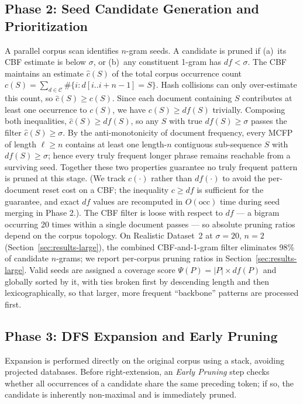\documentclass[runningheads]{llncs}
\begin{document}
    \subsection{Phase 2: Seed Candidate Generation and Prioritization}
    A parallel corpus scan identifies $n$-gram seeds. A candidate is pruned if (a)~its CBF estimate is below $\sigma$, or (b)~any constituent 1-gram has $df < \sigma$. The CBF maintains an estimate $\hat{c}(S)$ of the total corpus occurrence count $c(S) = \sum_{d \in \mathcal{C}} \#\{i : d[i..i+n-1] = S\}$. Hash collisions can only over-estimate this count, so $\hat{c}(S) \geq c(S)$. Since each document containing $S$ contributes at least one occurrence to $c(S)$, we have $c(S) \geq df(S)$ trivially. Composing both inequalities, $\hat{c}(S) \geq df(S)$, so any $S$ with true $df(S) \geq \sigma$ passes the filter $\hat{c}(S) \geq \sigma$. By the anti-monotonicity of document frequency, every MCFP of length $\ell \geq n$ contains at least one length-$n$ contiguous sub-sequence $S$ with $df(S) \geq \sigma$; hence every truly frequent longer phrase remains reachable from a surviving seed. Together these two properties guarantee no truly frequent pattern is pruned at this stage. (We track $c(\cdot)$ rather than $df(\cdot)$ to avoid the per-document reset cost on a CBF; the inequality $c \geq df$ is sufficient for the guarantee, and exact $df$ values are recomputed in $O(\text{occ})$ time during seed merging in Phase 2.). The CBF filter is loose with respect to $df$ — a bigram occurring 20 times within a single document passes — so absolute pruning ratios depend on the corpus topology. On Realistic Dataset~2 at $\sigma = 20$, $n = 2$ (Section~\ref{sec:results-large}), the combined CBF-and-1-gram filter eliminates 98\% of candidate $n$-grams; we report per-corpus pruning ratios in Section~\ref{sec:results-large}. Valid seeds are assigned a coverage score $\Psi(P) = |P| \times df(P)$ and globally sorted by it, with ties broken first by descending length and then lexicographically, so that larger, more frequent ``backbone'' patterns are processed first.

    \subsection{Phase 3: DFS Expansion and Early Pruning}
    Expansion is performed directly on the original corpus using a stack, avoiding projected databases. Before right-extension, an \emph{Early Pruning} step checks whether all occurrences of a candidate share the same preceding token; if so, the candidate is inherently non-maximal and is immediately pruned.
\end{document}
